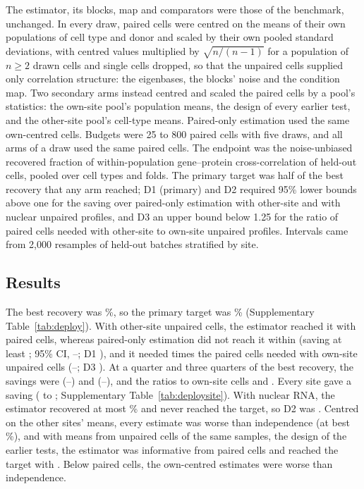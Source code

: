 The estimator, its blocks, map and comparators were those of the benchmark, unchanged. In every draw, paired cells were centred on the means of their own populations of cell type and donor and scaled by their own pooled standard deviations, with centred values multiplied by $\sqrt{n/(n-1)}$ for a population of $n\ge2$ drawn cells and single cells dropped, so that the unpaired cells supplied only correlation structure: the eigenbases, the blocks' noise and the condition map. Two secondary arms instead centred and scaled the paired cells by a pool's statistics: the own-site pool's population means, the design of every earlier test, and the other-site pool's cell-type means. Paired-only estimation used the same own-centred cells. Budgets were 25 to 800 paired cells with five draws, and all arms of a draw used the same paired cells. The endpoint was the noise-unbiased recovered fraction of within-population gene--protein cross-correlation of held-out cells, pooled over cell types and folds. The primary target was half of the best recovery that any arm reached; D1 (primary) and D2 required 95\% lower bounds above one for the saving over paired-only estimation with other-site and with nuclear unpaired profiles, and D3 an upper bound below 1.25 for the ratio of paired cells needed with other-site to own-site unpaired profiles. Intervals came from 2,000 resamples of held-out batches stratified by site.

\subsection*{Results}
The best recovery was \DpLevel\%, so the primary target was \DpTarget\% (Supplementary Table~\ref{tab:deploy}). With other-site unpaired cells, the estimator reached it with \DpCellsOther{} paired cells, whereas paired-only estimation did not reach it within \DpMaxBudget{} (saving at least \DpSaveOther; 95\% CI, \DpSaveOtherLo--\DpSaveOtherHi; D1 \DpDOne), and it needed \DpNonInf{} times the paired cells needed with own-site unpaired cells (\DpNonInfLo--\DpNonInfHi; D3 \DpDThree). At a quarter and three quarters of the best recovery, the savings were \DpSaveOtherQuarter{} (\DpSaveOtherQuarterLo--\DpSaveOtherQuarterHi) and \DpSaveOtherThreeQ{} (\DpSaveOtherThreeQLo--\DpSaveOtherThreeQHi), and the ratios to own-site cells \DpNonInfQuarter{} and \DpNonInfThreeQ. Every site gave a saving (\DpSiteMin{} to \DpSiteMax; Supplementary Table~\ref{tab:deploysite}). With nuclear RNA, the estimator recovered at most \DpRfAssayMax\% and never reached the target, so D2 was \DpDTwo. Centred on the other sites' means, every estimate was worse than independence (at best \DpRfMeansBest\%), and with means from unpaired cells of the same samples, the design of the earlier tests, the estimator was informative from \DpFirstBudget{} paired cells and reached the target with \DpCellsSamePool. Below \DpOwnNegativeBelow{} paired cells, the own-centred estimates were worse than independence.

